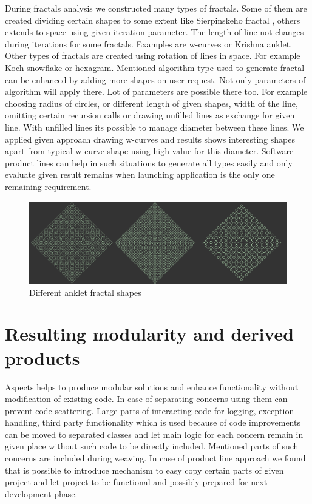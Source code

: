 \documentclass[11pt,slovak,a4paper,twoside]{article}
\begin{document}
During fractals analysis we constructed many types of fractals. Some of them are created dividing certain shapes to some extent like Sierpinskeho fractal \cite{pelanek_programatorska_2012}, others extends to space using given iteration parameter. The length of line not changes during iterations for some fractals. Examples are w-curves or Krishna anklet. Other types of fractals are created using rotation of lines in space. For example Koch snowflake or hexagram. Mentioned algorithm type used to generate fractal can be enhanced by adding more shapes on user request. Not only parameters of algorithm will apply there. Lot of parameters are possible there too. For example choosing radius of circles, or different length of given shapes, width of the line, omitting certain recursion calls or drawing unfilled lines as exchange for given line. With unfilled lines its possible to manage diameter between these lines. We applied given approach drawing w-curves and results shows interesting shapes apart from typical w-curve shape using high value for this diameter. Software product lines can help in such situations to generate all types easily and only evaluate given result remains when launching application is the only one remaining requirement.

\begin{figure}[H]  %
					\begin{center}
									\includegraphics[width=\linewidth]{fig/fractalsAnklet.png}
									\caption{Different anklet fractal shapes}
									\label{ankletFractalTypes}
					\end{center}
\end{figure}



\section{Resulting modularity and derived products} \label{resultingModularity}

Aspects helps to produce modular solutions and enhance functionality without modification of existing code. In case of separating concerns using them can prevent code scattering. Large parts of interacting code for logging, exception handling, third party functionality which is used because of code improvements can be moved to separated classes and let main logic for each concern remain in given place without such code to be directly included. Mentioned parts of such concerns are included during weaving. In case of product line approach we found that is possible to introduce mechanism to easy copy certain parts of given project and let project to be functional and possibly prepared for next development phase. 
\end{document}
